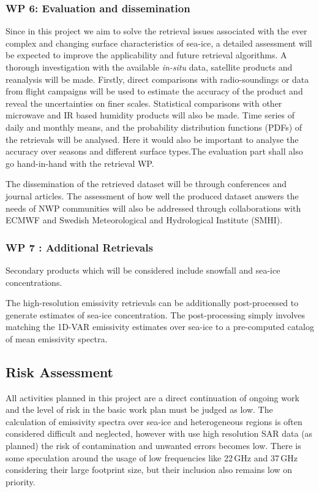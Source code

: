 \documentclass[12pt,oneside,a4paper]{article}
\begin{document}
\subsubsection*{WP 6: Evaluation and dissemination}
%
\label{sec:evaluation}
Since in this project we aim to solve the retrieval issues associated with the ever complex and changing surface characteristics of sea-ice, a detailed assessment will be expected to improve the applicability and future retrieval algorithms. A thorough investigation with the available \textit{in-situ} data, satellite products and reanalysis will be made. Firstly, direct comparisons with radio-soundings or data from flight campaigns will be used to estimate the accuracy of the product and reveal the uncertainties on finer scales. Statistical comparisons with other microwave and IR based humidity products  will also be made. Time series of daily and monthly means, and the probability distribution functions (PDFs) of the retrievals will be analysed. Here it would also be important to analyse the accuracy over seasons and different surface types.The evaluation part shall also go hand-in-hand with the retrieval WP.

The dissemination of the retrieved dataset will be through conferences and journal articles. The assessment of how well the produced dataset answers the needs of NWP communities will also be addressed through collaborations with ECMWF and Swedish Meteorological and Hydrological Institute (SMHI). 
\vspace{-1.0ex}
\subsubsection*{WP 7 : Additional Retrievals}
%
\label{sec:other_retrievals}

Secondary products which will be considered include snowfall and sea-ice concentrations.  


The high-resolution emissivity retrievals can be additionally post-processed to generate estimates of sea-ice concentration. The post-processing simply involves matching the 1D-VAR emissivity estimates over sea-ice to a pre-computed catalog of mean emissivity spectra. %

 
\subsection{Risk Assessment}
%
\label{sec:risk}
All activities planned in this project are a direct continuation of ongoing work and the level of risk in the basic work plan must be judged as low. The calculation of emissivity spectra over sea-ice and heterogeneous regions is often considered difficult and neglected, however with use high resolution SAR data (as planned) the risk of contamination and unwanted errors becomes low. There is some speculation around the usage of low frequencies like 22\,GHz and 37\,GHz considering their large footprint size, but their inclusion also remains low on priority. 
\end{document}
